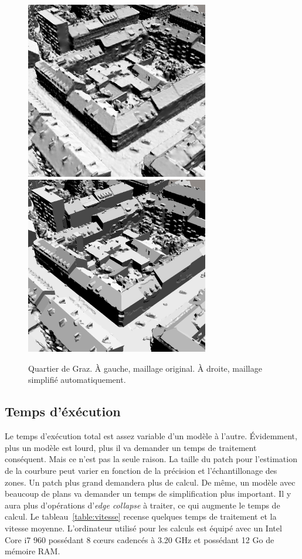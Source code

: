 ﻿\documentclass[12pt, twoside]{article}
\begin{document}
\begin{figure}[h]
\centering
\includegraphics[width=8cm,keepaspectratio]{Graz.png} \includegraphics[width=8cm,keepaspectratio]{GrazAuto.png} 
\caption{Quartier de Graz. À gauche, maillage original. À droite, maillage simplifié automatiquement.}
\end{figure}

\subsection{Temps d'éxécution}
Le temps d'exécution total est assez variable d'un modèle à l'autre. Évidemment, plus un modèle est lourd, plus il va demander un temps de traitement conséquent. Mais ce n'est pas la seule raison. La taille du patch pour l'estimation de la courbure peut varier en fonction de la précision et l'échantillonage des zones. Un patch plus grand demandera plus de calcul. De même, un modèle avec beaucoup de plans va demander un temps de simplification plus important. Il y aura plus d'opérations d'\textit{edge collapse} à traiter, ce qui augmente le temps de calcul. Le tableau~\ref{table:vitesse} recense quelques temps de traitement et la vitesse moyenne. L'ordinateur utilisé pour les calculs est équipé avec un Intel Core i7 960 possédant 8 c\oe{}urs cadencés à 3.20 GHz et possédant 12 Go de mémoire RAM.
\end{document}
